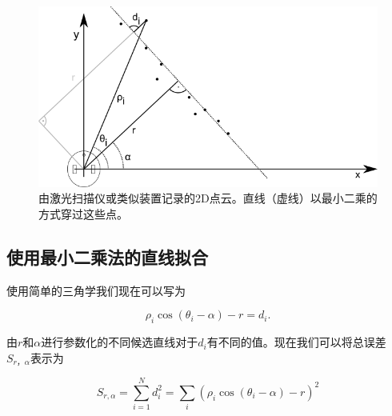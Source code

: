 \begin{figure}
	\centering
		\includegraphics[width=\textwidth]{figs/linefitting.png}
	\caption{由激光扫描仪或类似装置记录的2D点云。直线（虚线）以最小二乘的方式穿过这些点。}
	\label{fig:linefitting}
\end{figure}

\subsection{使用最小二乘法的直线拟合}

使用简单的三角学我们现在可以写为

\begin{equation}
\rho_i \cos(\theta_i-\alpha)-r=d_i.
\end{equation}


由$r$和$\alpha$进行参数化的不同候选直线对于$d_i$有不同的值。现在我们可以将总误差$S_{r，\alpha}$表示为


\begin{equation}
S_{r,\alpha}=\sum_{i=1}^{N}{d_i^2}=\sum_i(\rho_i \cos(\theta_i-\alpha)-r)^2
\end{equation}


